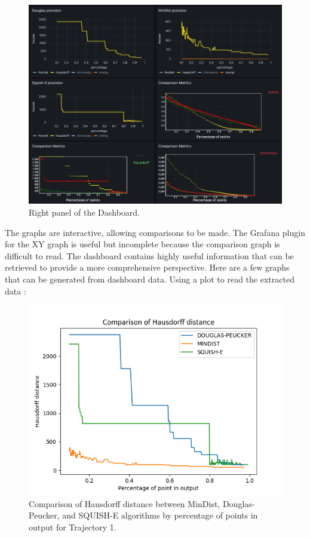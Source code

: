 \begin{figure}
	\centering
	\includegraphics[width=1\linewidth]{figures/Stats/DashBoardright.jpg}
	\caption{Right panel of the Dashboard. }
	\label{fig:dashright}
\end{figure}

The graphs are interactive, allowing comparisons to be made. The Grafana plugin for the XY graph is useful but incomplete because the comparison graph is difficult to read. The dashboard contains highly useful information that can be retrieved to provide a more comprehensive perspective. Here are a few graphs that can be generated from dashboard data. Using a plot to read the extracted data :

\begin{figure}
	\centering
	\includegraphics[width=0.9\linewidth]{figures/Stats/hausdorff_comp.png}
	\caption{Comparison of Hausdorff distance between MinDist, Douglas-Peucker, and SQUISH-E algorithms by percentage of points in output for Trajectory 1.}
	\label{fig:comp_h}
\end{figure}

